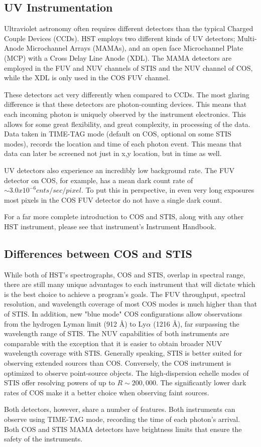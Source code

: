 \subsection{UV Instrumentation}
Ultraviolet astronomy often requires different detectors than the typical Charged Couple Devices (CCDs).  HST employs two different kinds of UV detectors; Multi-Anode Microchannel Arrays (MAMAs), and an open face Microchannel Plate (MCP) with a Cross Delay Line Anode (XDL).  The MAMA detectors are employed in the FUV and NUV channels of STIS and the NUV channel of COS, while the XDL is only used in the COS FUV channel. 

These detectors act very differently when compared to CCDs.  The most glaring difference is that these detectors are photon-counting devices.  This means that each incoming photon is uniquely observed by the instrument electronics.  This allows for some great flexibility, and great complexity, in processing of the data.  Data taken in TIME-TAG mode (default on COS, optional on some STIS modes), records the location and time of each photon event.  This means that data can later be screened not just in x,y location, but in time as well.  

UV detectors also experience an incredibly low background rate.  The FUV detector on COS, for example, has a mean dark count rate of $\sim 3.0x10^{-6} cnts/sec/pixel$.   To put this in perspective, in even very long exposures most pixels in the COS FUV detector do not have a single dark count.  

For a far more complete introduction to COS and STIS, along with any other HST instrument, please see that instrument's Instrument Handbook.

\subsection{Differences between COS and STIS}
While both of HST's spectrographs, COS and STIS, overlap in spectral range, there are still many unique advantages to each instrument that will dictate which is the best choice to achieve a program's goals. The FUV throughput, spectral resolution, and wavelength coverage of most COS modes is much higher than that of STIS. In addition, new "blue mode" COS configurations allow observations from the hydrogen Lyman limit (912 \AA) to Ly$\alpha$ (1216 \AA), far surpassing the wavelength range of STIS. The NUV capabilities of both instruments are comparable with the exception that it is easier to obtain broader NUV wavelength coverage with STIS. Generally speaking, STIS is better suited for observing extended sources than COS. Conversely, the COS instrument is optimized to observe point-source objects. The high-dispersion echelle modes of STIS offer resolving powers of up to $R \sim 200,000$. The significantly lower dark rates of COS make it a better choice when observing faint sources. 

Both detectors, however, share a number of features. Both instruments can observe using TIME-TAG mode, recording the time of each photon's arrival. Both COS and STIS MAMA detectors have brightness limits that ensure the safety of the instruments.